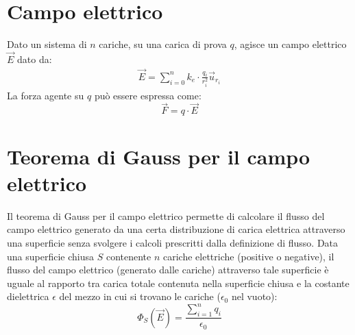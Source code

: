 \section{Campo elettrico}
Dato un sistema di $n$ cariche, su una carica di prova $q$, agisce un campo elettrico $\vec{E}$ dato da:
	\begin{displaymath}\begin{aligned}
		\vec{E} = \sum_{i=0}^n k_e \cdot \frac{q_i}{r_i^2}\vec{u}_{r_i}
	\end{aligned}\end{displaymath}
La forza agente su $q$ può essere espressa come:
	\begin{displaymath}
		\vec{F} = q \cdot \vec{E}
	\end{displaymath}
    
\section{Teorema di Gauss per il campo elettrico}
Il teorema di Gauss per il campo elettrico permette di calcolare il flusso del campo elettrico generato da una certa distribuzione di carica elettrica attraverso una superficie senza svolgere i calcoli prescritti dalla definizione di flusso.
Data una superficie chiusa $S$ contenente $n$ cariche elettriche (positive o negative), il flusso del campo elettrico (generato dalle cariche) attraverso tale superficie è uguale al rapporto tra carica totale contenuta nella superficie chiusa e la costante dielettrica $\epsilon$ del mezzo in cui si trovano le cariche ($\epsilon_0$ nel vuoto):
\begin{displaymath}
	\Phi_S(\vec{E}) = \frac{\sum_{i=1}^n q_i}{\epsilon_0}
\end{displaymath}

